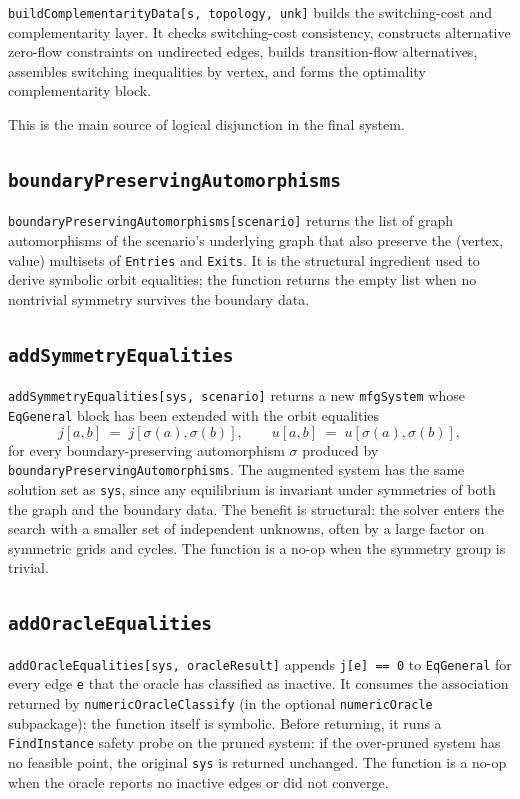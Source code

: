 \documentclass[11pt]{article}
\begin{document}
\texttt{buildComplementarityData[s, topology, unk]} builds the switching-cost and complementarity layer. It checks switching-cost consistency, constructs alternative zero-flow constraints on undirected edges, builds transition-flow alternatives, assembles switching inequalities by vertex, and forms the optimality complementarity block.

This is the main source of logical disjunction in the final system.

\subsection*{\texttt{boundaryPreservingAutomorphisms}}

\texttt{boundaryPreservingAutomorphisms[scenario]} returns the list of graph automorphisms of the scenario's underlying graph that also preserve the (vertex, value) multisets of \texttt{Entries} and \texttt{Exits}. It is the structural ingredient used to derive symbolic orbit equalities; the function returns the empty list when no nontrivial symmetry survives the boundary data.

\subsection*{\texttt{addSymmetryEqualities}}

\texttt{addSymmetryEqualities[sys, scenario]} returns a new \texttt{mfgSystem} whose \texttt{EqGeneral} block has been extended with the orbit equalities
\[
j[a, b] \;=\; j[\sigma(a), \sigma(b)],
\qquad
u[a, b] \;=\; u[\sigma(a), \sigma(b)],
\]
for every boundary-preserving automorphism $\sigma$ produced by \texttt{boundaryPreservingAutomorphisms}. The augmented system has the same solution set as \texttt{sys}, since any equilibrium is invariant under symmetries of both the graph and the boundary data. The benefit is structural: the solver enters the search with a smaller set of independent unknowns, often by a large factor on symmetric grids and cycles. The function is a no-op when the symmetry group is trivial.

\subsection*{\texttt{addOracleEqualities}}

\texttt{addOracleEqualities[sys, oracleResult]} appends \texttt{j[e] == 0} to \texttt{EqGeneral} for every edge \texttt{e} that the oracle has classified as inactive. It consumes the association returned by \texttt{numericOracleClassify} (in the optional \texttt{numericOracle} subpackage); the function itself is symbolic. Before returning, it runs a \texttt{FindInstance} safety probe on the pruned system: if the over-pruned system has no feasible point, the original \texttt{sys} is returned unchanged. The function is a no-op when the oracle reports no inactive edges or did not converge.
\end{document}
